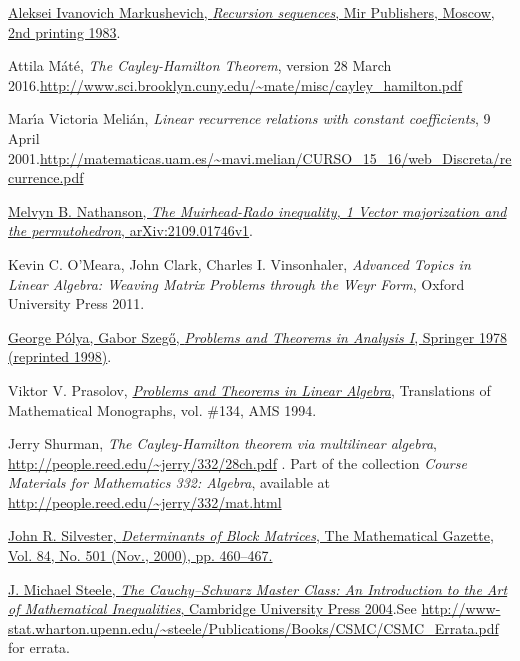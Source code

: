 \documentclass[numbers=enddot,12pt,final,onecolumn,notitlepage]{scrartcl}%
\numberwithin{exer}{subsection}
\theoremstyle{definition}
\begin{document}
\begin{thebibliography}{99999999}
%
\href{https://archive.org/details/recursion-sequences}{Aleksei Ivanovich
Markushevich, \textit{Recursion sequences}, Mir Publishers, Moscow, 2nd
printing 1983}.

Attila M\'{a}t\'{e}, \textit{The Cayley-Hamilton
Theorem}, version 28 March 2016.\newline\url{http://www.sci.brooklyn.cuny.edu/~mate/misc/cayley_hamilton.pdf}

Mar\'{\i}a Victoria Meli\'{a}n, \textit{Linear
recurrence relations with constant coefficients}, 9 April 2001.\newline\url{http://matematicas.uam.es/~mavi.melian/CURSO_15_16/web_Discreta/recurrence.pdf}

\href{https://arxiv.org/abs/2109.01746v1}{Melvyn
B. Nathanson, \textit{The Muirhead-Rado inequality, 1 Vector majorization and
the permutohedron}, arXiv:2109.01746v1}.

Kevin C. O'Meara, John Clark, Charles I.
Vinsonhaler, \textit{Advanced Topics in Linear Algebra: Weaving Matrix
Problems through the Weyr Form}, Oxford University Press 2011.

%
\href{https://doi.org/10.1007/978-3-642-61983-0}{George P\'{o}lya, Gabor
Szeg\H{o}, \textit{Problems and Theorems in Analysis I}, Springer 1978
(reprinted 1998)}.

Viktor V. Prasolov,
\textit{\href{http://www2.math.su.se/~mleites/books/prasolov-1994-problems.pdf}{\textit{Problems
and Theorems in Linear Algebra}}}, Translations of Mathematical Monographs,
vol. \#134, AMS 1994.

Jerry Shurman, \textit{The Cayley-Hamilton theorem
via multilinear algebra}, \url{http://people.reed.edu/~jerry/332/28ch.pdf} .
Part of the collection \textit{Course Materials for Mathematics 332: Algebra},
available at \url{http://people.reed.edu/~jerry/332/mat.html}

%
\href{https://web.archive.org/web/20140505161153/http://www.mth.kcl.ac.uk/~jrs/gazette/blocks.pdf}{John
R. Silvester, \textit{Determinants of Block Matrices}, The Mathematical
Gazette, Vol. 84, No. 501 (Nov., 2000), pp. 460--467.}

%
\href{http://www.ma.huji.ac.il/~ehudf/courses/Ineq09/The Cauchy-Schwarz Master Class .pdf}{J.
Michael Steele, \textit{The Cauchy--Schwarz Master Class: An Introduction to
the Art of Mathematical Inequalities}, Cambridge University Press
2004}.\newline See
\url{http://www-stat.wharton.upenn.edu/~steele/Publications/Books/CSMC/CSMC_Errata.pdf}
for errata.


\end{thebibliography}
\end{document}
